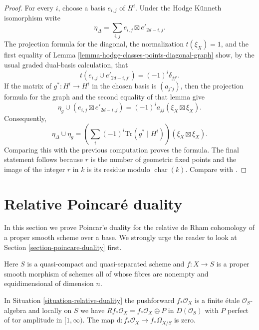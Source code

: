 \begin{proof}
\medskip\noindent
For every $i$, choose a basis $e_{i,j}$ of $H^i$. Under the Hodge
K\"unneth isomorphism write
$$
\eta_\Delta =
\sum_{i,j} e_{i,j} \boxtimes e'_{2d-i,j}.
$$
The projection formula for the diagonal, the normalization
$t(\xi_X)=1$, and the first equality of Lemma
\ref{lemma-hodge-classes-points-diagonal-graph} show, by the usual
graded dual-basis calculation, that
$$
t(e_{i,j} \cup e'_{2d-i,j'}) = (-1)^i\delta_{jj'}.
$$
If the matrix of $g^* : H^i \to H^i$ in the chosen basis is
$(a_{j'j})$, then the projection formula for the graph and the second
equality of that lemma give
$$
\eta_g \cup (e_{i,j} \boxtimes e'_{2d-i,j}) =
(-1)^i a_{jj}(\xi_X \boxtimes \xi_X).
$$
Consequently,
$$
\eta_\Delta \cup \eta_g =
\left(\sum_i(-1)^i\text{Tr}(g^* \mid H^i)\right)
(\xi_X \boxtimes \xi_X).
$$
Comparing this with the previous computation proves the formula. The final
statement follows because $r$ is the number of geometric fixed points and
the image of the integer $r$ in $k$ is its residue modulo
$\operatorname{char}(k)$. Compare with
\cite[Expos\'e 149, Th\'eor\`eme 5, p. 189]{FGA}.
\end{proof}






\section{Relative Poincar\'e duality}
\label{section-relative-poincare-duality}

\noindent
In this section we prove Poincar'e duality for the relative de Rham cohomology
of a proper smooth scheme over a base. We strongly urge the reader to
look at Section \ref{section-poincare-duality} first.

\begin{situation}
\label{situation-relative-duality}
Here $S$ is a quasi-compact and quasi-separated scheme and
$f : X \to S$ is a proper smooth morphism of schemes all of whose
fibres are nonempty and equidimensional of dimension $n$.
\end{situation}

\begin{lemma}
\label{lemma-relative-bottom-part-degenerates}
In Situation \ref{situation-relative-duality} the pushforward
$f_*\mathcal{O}_X$ is a finite \'etale $\mathcal{O}_S$-algebra
and locally on $S$ we have $Rf_*\mathcal{O}_X = f_*\mathcal{O}_X \oplus P$
in $D(\mathcal{O}_S)$ with $P$ perfect of tor amplitude in $[1, \infty)$.
The map $\text{d} : f_*\mathcal{O}_X \to f_*\Omega_{X/S}$ is zero.
\end{lemma}


